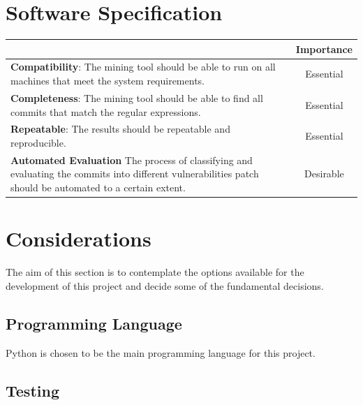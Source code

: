 \documentclass[12pt, a4paper]{report}
\begin{document}
{\section{Software Specification}
\begin{table}[H]
	\begin{center}
		\begin{tabular}{|p{9.5cm}|c|}
			\hline
			\rowcolor[HTML]{D8D8D8}
			\multicolumn{1}{|c|}{Criteria} & Importance \\ \hline
			\textbf{Compatibility}: The mining tool should be able to run on all machines that meet the
			system requirements. & Essential \\ \hline
			\textbf{Completeness}: The mining tool should be able to find all commits that match the
			regular expressions. & Essential \\ \hline
			\textbf{Repeatable}: The results should be repeatable and reproducible. & Essential \\ \hline
			\textbf{Automated Evaluation} The process of classifying and evaluating the commits into
			different vulnerabilities patch should be automated to a certain extent. & Desirable \\ \hline
			\end{tabular}
		 \label{table:criteria}
	\end{center}
\end{table}


\section{Considerations}
The aim of this section is to contemplate the options available for the development of this project
and decide some of the fundamental decisions.

\subsection{Programming Language}
Python is chosen to be the main programming language for this project.

\subsection{Testing}



}
\end{document}
